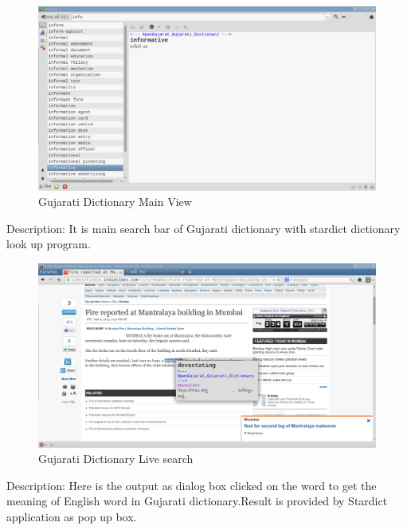 \newpage
\begin{figure}[h]
\begin{center}
  \includegraphics[scale=0.4] {14.png}
  \caption[Screenshot - Gujarati Dictionary]{Gujarati Dictionary Main View}
\end{center}
\end{figure}
Description: It is main search bar of Gujarati dictionary with stardict dictionary look up program.
\newpage

\begin{figure}[h]
\begin{center}
  \includegraphics[scale=0.35] {15.png}
  \caption[Screenshot - Gujarati Dictionary Live search]{Gujarati Dictionary Live search}
\end{center}
\end{figure}
Description: Here is the output as dialog box clicked on the word to get the meaning of English word in Gujarati dictionary.Result is provided by Stardict application as pop up box.

